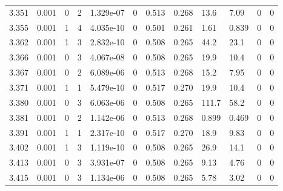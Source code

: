 \documentclass[preview]{standalone}
\begin{document}
{{{{{{{{\begin{tabular}{L{1.2cm}C{1.2cm} C{0.3cm}C{0.5cm} C{1.4cm}C{1.4cm} C{1.4cm}C{1.4cm} C{1.6cm}C{1.6cm} C{1.6cm}C{1.6cm}}
  3.351  &  0.001  & 0     &  2 &  1.329e-07  & 0  &  0.513&   0.268& 13.6 & 7.09   &  0 & 0  \\ 
  3.355  &  0.001  & 1     &  4 &  4.035e-10  & 0  &  0.501&   0.261& 1.61 & 0.839   &  0 & 0  \\ 
  3.362  &  0.001  & 1     &  3 &  2.832e-10  & 0  &  0.508&   0.265& 44.2 & 23.1   &  0 & 0  \\ 
  3.366  &  0.001  & 0     &  3 &  4.067e-08  & 0  &  0.508&   0.265& 19.9 & 10.4   &  0 & 0  \\ 
  3.367  &  0.001  & 0     &  2 &  6.089e-06  & 0  &  0.513&   0.268& 15.2 & 7.95   &  0 & 0  \\ 
  3.371  &  0.001  & 1     &  1 &  5.479e-10  & 0  &  0.517&   0.270& 19.9 & 10.4   &  0 & 0  \\ 
  3.380  &  0.001  & 0     &  3 &  6.063e-06  & 0  &  0.508&   0.265& 111.7 & 58.2   &  0 & 0  \\ 
  3.381  &  0.001  & 0     &  2 &  1.142e-06  & 0  &  0.513&   0.268& 0.899 & 0.469   &  0 & 0  \\ 
  3.391  &  0.001  & 1     &  1 &  2.317e-10  & 0  &  0.517&   0.270& 18.9 & 9.83   &  0 & 0  \\ 
  3.402  &  0.001  & 1     &  3 &  1.119e-10  & 0  &  0.508&   0.265& 26.9 & 14.1   &  0 & 0  \\ 
  3.413  &  0.001  & 0     &  3 &  3.931e-07  & 0  &  0.508&   0.265& 9.13 & 4.76   &  0 & 0  \\ 
  3.415  &  0.001  & 0     &  3 &  1.134e-06  & 0  &  0.508&   0.265& 5.78 & 3.02   &  0 & 0  \\ 
\hline 
\end{tabular} 

}}}}}}}}
\end{document}
